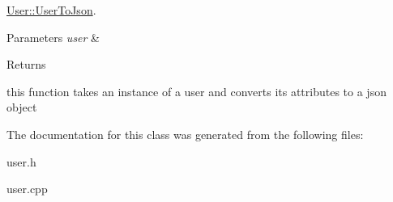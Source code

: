 \hyperlink{classUser_aa4ecad468e06bde01b44b4b2fd1186a6}{User\-::\-User\-To\-Json}. 


\begin{DoxyParams}{Parameters}
{\em user} & \\
\hline
\end{DoxyParams}
\begin{DoxyReturn}{Returns}

\end{DoxyReturn}
this function takes an instance of a user and converts its attributes to a json object 

The documentation for this class was generated from the following files\-:\begin{DoxyCompactItemize}
\item 
user.\-h\item 
user.\-cpp\end{DoxyCompactItemize}
